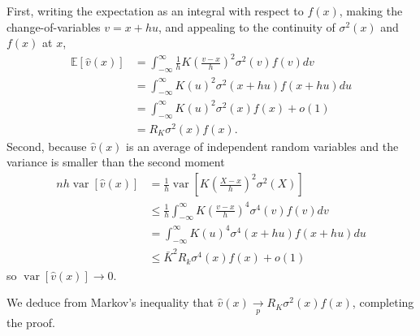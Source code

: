 \documentclass[10pt]{article}
\begin{document}
First, writing the expectation as an integral with respect to $f(x)$, making the change-of-variables $v=x+h u$, and appealing to the continuity of $\sigma^{2}(x)$ and $f(x)$ at $x$,
$$
\begin{aligned}
\mathbb{E}[\widehat{v}(x)] &=\int_{-\infty}^{\infty} \frac{1}{h} K\left(\frac{v-x}{h}\right)^{2} \sigma^{2}(v) f(v) d v \\
&=\int_{-\infty}^{\infty} K(u)^{2} \sigma^{2}(x+h u) f(x+h u) d u \\
&=\int_{-\infty}^{\infty} K(u)^{2} \sigma^{2}(x) f(x)+o(1) \\
&=R_{K} \sigma^{2}(x) f(x) .
\end{aligned}
$$
Second, because $\widehat{v}(x)$ is an average of independent random variables and the variance is smaller than the second moment
$$
\begin{aligned}
n h \operatorname{var}[\widehat{v}(x)] &=\frac{1}{h} \operatorname{var}\left[K\left(\frac{X-x}{h}\right)^{2} \sigma^{2}(X)\right] \\
& \leq \frac{1}{h} \int_{-\infty}^{\infty} K\left(\frac{v-x}{h}\right)^{4} \sigma^{4}(v) f(v) d v \\
&=\int_{-\infty}^{\infty} K(u)^{4} \sigma^{4}(x+h u) f(x+h u) d u \\
& \leq \bar{K}^{2} R_{k} \sigma^{4}(x) f(x)+o(1)
\end{aligned}
$$
so $\operatorname{var}[\widehat{v}(x)] \rightarrow 0$.

We deduce from Markov's inequality that $\widehat{v}(x) \underset{p}{\longrightarrow} R_{K} \sigma^{2}(x) f(x)$, completing the proof.
\end{document}
